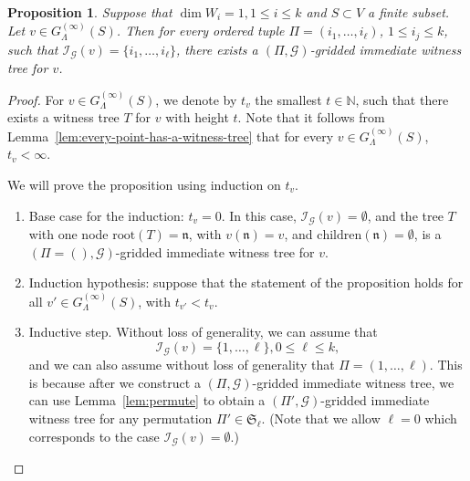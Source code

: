 \documentclass[10pt]{amsart}
\theoremstyle{plain}
\newtheorem{proposition}[lemma]{Proposition}
\theoremstyle{definition}
\providecommand{\cG}[0]{\ensuremath{\mathcal G}\xspace}
\providecommand{\cI}[0]{\ensuremath{\mathcal I}\xspace}
\let\leq\leqslant
\begin{document}
\begin{proposition}
\label{prop:gridded-witness}
    Suppose that $\dim W_i = 1, 1 \leq i \leq k$ and $S \subset V$ a finite subset.
    Let $v \in G^{(\infty)}_\Lambda(S)$.
    Then for every ordered tuple $\Pi=(i_1,\ldots,i_\ell)$, $1 \leq i_j \leq k$,
    such that $\cI_\cG(v)  =  \{i_1,\ldots,i_\ell\}$,  
    there exists a $(\Pi,\cG)$-gridded 
    immediate witness tree for $v$. 
    \end{proposition}

\begin{proof}
  For $v \in G^{(\infty)}_\Lambda(S)$, we denote by $t_v$ the smallest $t \in \mathbb{N}$, such that 
there exists a witness tree $T$ for $v$ with 
height $t$.
Note that it follows from Lemma~\ref{lem:every-point-has-a-witness-tree} that for every $v \in G^{(\infty)}_\Lambda(S)$, $t_v < \infty$.

  We will prove the proposition using induction on $t_v$.
  
  \begin{enumerate}[1.]
    \item 
    \label{itemlabel:proof:prop:gridded-witness:1}
    Base case for the induction: $t_v = 0$. In this case, $\cI_\cG(v) = \emptyset$, and the tree $T$ with one node $\mathrm{root}(T) = \mathfrak{n}$, with $v(\mathfrak{n}) = v$,
    and $\mathrm{children}(\mathfrak{n}) = \emptyset$, is a $(\Pi=(),\cG)$-gridded immediate witness tree for $v$.

    \item 
    \label{itemlabel:proof:prop:gridded-witness:2}
    Induction hypothesis:  
    suppose that the statement of the proposition holds for all $v' \in G^{(\infty)}_\Lambda(S)$, with $t_{v'} < t_v$.

    \item 
    \label{itemlabel:proof:prop:gridded-witness:3}    
    Inductive step. Without loss of generality, we can assume that 
            \[
            \cI_\cG(v)  = \{1,\ldots,\ell\}, 0 \leq \ell \leq k,
            \]
            and  
            we can also assume without loss of generality that 
            $\Pi=(1,\ldots,\ell)$. This is because after we construct a 
            $(\Pi,\cG)$-gridded immediate witness tree, we can use
            Lemma~\ref{lem:permute} to obtain a $(\Pi',\cG)$-gridded immediate witness tree for any permutation $\Pi' \in \mathfrak{S}_\ell$.
            (Note that we allow $\ell = 0$ which corresponds to the case
            $\cI_\cG(v) = \emptyset$.)
            

\end{enumerate}
\end{proof}
\end{document}
